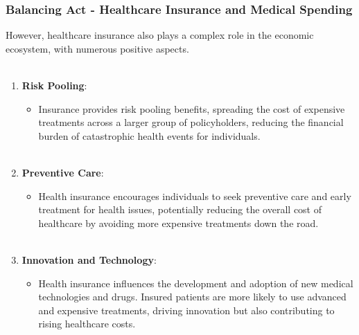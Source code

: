 \documentclass[notes,10pt, aspectratio=169]{beamer}
\begin{document}
\begin{frame}
\frametitle{Balancing Act - Healthcare Insurance and Medical Spending}
However, healthcare insurance also plays a complex role in the economic ecosystem, with numerous positive aspects.\\\\[1em]

\begin{enumerate}
  \item \textbf{Risk Pooling}:
    \begin{itemize}
      \item Insurance provides risk pooling benefits, spreading the cost of expensive treatments across a larger group of policyholders, reducing the financial burden of catastrophic health events for individuals.\\\\[1em]
    \end{itemize}

  \item \textbf{Preventive Care}:
    \begin{itemize}
      \item Health insurance encourages individuals to seek preventive care and early treatment for health issues, potentially reducing the overall cost of healthcare by avoiding more expensive treatments down the road.\\\\[1em]
    \end{itemize}

  \item \textbf{Innovation and Technology}:
    \begin{itemize}
      \item Health insurance influences the development and adoption of new medical technologies and drugs. Insured patients are more likely to use advanced and expensive treatments, driving innovation but also contributing to rising healthcare costs.\\\\[1em]
    \end{itemize}

\end{enumerate}
\end{frame}
\end{document}
